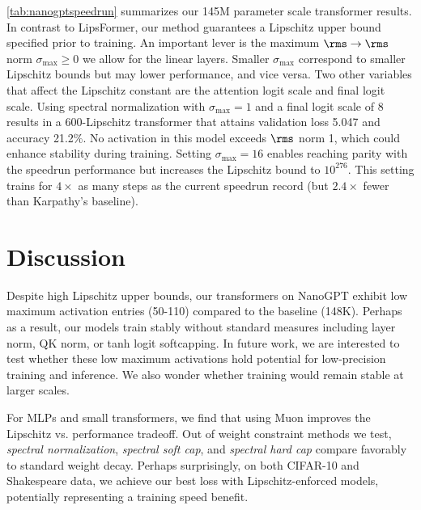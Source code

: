 \begin{table}[tbp]
    \label{tab:nanogptspeedrun}
\end{table}

\cref{tab:nanogptspeedrun} summarizes our 145M parameter scale transformer results. In contrast to LipsFormer, our method guarantees a Lipschitz upper bound specified prior to training. An important lever is the maximum $\rms\to\rms$ norm $\sigma_\text{max} \geq 0$ we allow for the linear layers. Smaller $\sigma_\text{max}$ correspond to smaller Lipschitz bounds but may lower performance, and vice versa. Two other variables that affect the Lipschitz constant are the attention logit scale and final logit scale. Using spectral normalization with $\sigma_\text{max}=1$ and a final logit scale of 8 results in a 600-Lipschitz transformer that attains validation loss 5.047 and accuracy 21.2\%. No activation in this model exceeds $\rms$ norm 1, which could enhance stability during training. Setting $\sigma_\text{max}=16$ enables reaching parity with the speedrun performance but increases the Lipschitz bound to $10^{276}$. This setting trains for $4\times$ as many steps as the current speedrun record (but $2.4\times$ fewer than Karpathy's baseline).


\section{Discussion}
\label{sec:discussion}

Despite high Lipschitz upper bounds, our transformers on NanoGPT exhibit low maximum activation entries (50-110) compared to the baseline (148K). Perhaps as a result, our models train stably without standard measures including layer norm, QK norm, or tanh logit softcapping. In future work, we are interested to test whether these low maximum activations hold potential for low-precision training and inference. We also wonder whether training would remain stable at larger scales.

For MLPs and small transformers, we find that using Muon improves the Lipschitz vs. performance tradeoff. Out of weight constraint methods we test, \textit{spectral normalization}, \textit{spectral soft cap}, and \textit{spectral hard cap} compare favorably to standard weight decay. Perhaps surprisingly, on both CIFAR-10 and Shakespeare data, we achieve our best loss with Lipschitz-enforced models, potentially representing a training speed benefit.

